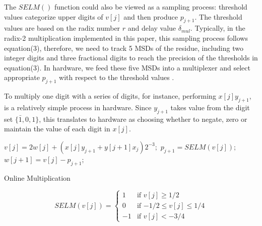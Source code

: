 \documentclass{sig-alternate}
\begin{document}
	The $SELM()$ function could also be viewed as a sampling process: threshold values categorize upper digits of $v[j]$ and then produce $p_{j+1}$. The threshold values are based on the radix number $r$ and delay value $\delta_{mul}$\cite{online_mul}. Typically, in the radix-2 multiplication implemented in this paper, this sampling process follows equation(3), therefore, we need to track 5 MSDs of the residue, including two integer digits and three fractional digits to reach the precision of the thresholds in equation(3). In hardware, we feed these five MSDs into a multiplexer and select appropriate $p_{j+1}$ with respect to the threshold values \cite{online_mul}. 
	
	
	To multiply one digit with a series of digits, for instance, performing $x[j]y_{j+1}$, is a relatively simple process in hardware. Since $y_{j+1}$ takes value from the digit set $\{\bar{1},0,1\}$, this translates to hardware as choosing whether to negate, zero or maintain the value of each digit in $x[j]$.   
		  
	\begin{algorithm}
		\begin{algorithmic}[1]
			\newline
	
				\State $v[j] = 2w[j] + (x[j]y_{j+1}+y[j+1]x_{j})2^{-3};$
				\State $p_{j+1} = SELM(v[j]);$
				\State $w[j+1] = v[j] - p_{j+1};$
			\EndFor
		\end{algorithmic}
		\caption{Online Multiplication}
		\label{alg:algorithm1}
	\end{algorithm}	
	\begin{equation}
		SELM (v[j]) = \begin{cases}
		1 &\text{if $v[j] \geq 1/2$}\\
		0 &\text{if $-1/2 \leq v[j] \leq1/4$}\\
		-1 &\text{if $v[j]<-3/4$ }
		\end{cases} 
	\end{equation}
	
\end{document}
